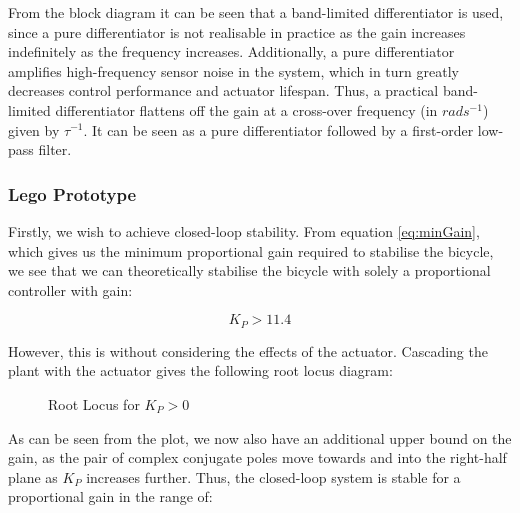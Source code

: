 From the block diagram it can be seen that a band-limited differentiator is used, since a pure differentiator is not realisable in practice as the gain increases indefinitely as the frequency increases. Additionally, a pure differentiator amplifies high-frequency sensor noise in the system, which in turn greatly decreases control performance and actuator lifespan. Thus, a practical band-limited differentiator flattens off the gain at a cross-over frequency (in $rads^{-1}$) given by $\tau^{-1}$. It can be seen as a pure differentiator followed by a first-order low-pass filter. \\

\subsubsection{Lego Prototype}
Firstly, we wish to achieve closed-loop stability. From equation \ref{eq:minGain}, which gives us the minimum proportional gain required to stabilise the bicycle, we see that we can theoretically stabilise the bicycle with solely a proportional controller with gain:

\begin{equation}
K_P > 11.4
\end{equation}

However, this is without considering the effects of the actuator. Cascading the plant with the actuator gives the following root locus diagram:

\begin{figure}[H]
	\centering
	\caption{Root Locus for $K_P > 0$}
\end{figure}

As can be seen from the plot, we now also have an additional upper bound on the gain, as the pair of complex conjugate poles move towards and into the right-half plane as $K_P$ increases further. Thus, the closed-loop system is stable for a proportional gain in the range of:

